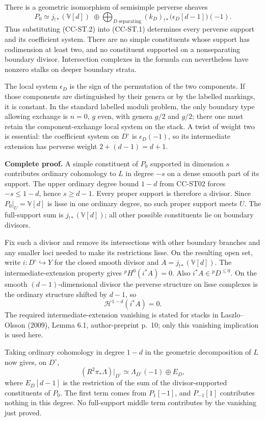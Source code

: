 \documentclass[11pt,a4paper]{article}
\theoremstyle{definition}\newtheorem{definition}[theorem]{Definition}
\theoremstyle{remark}\newtheorem{remark}[theorem]{Remark}
\begin{document}
There is a geometric isomorphism of semisimple perverse sheaves \[
P_0\simeq j_{!*}(\mathbb V[d])\;\oplus\!
\bigoplus_{D\text{ separating}}(k_D)_{!*}\bigl(\epsilon_D[d-1]\bigr)(-1).
\tag{CC-ST.2}
\] Thus substituting (CC-ST.2) into (CC-ST.1) determines every perverse
support and its coefficient system. There are no simple constituents
whose support has codimension at least two, and no constituent supported
on a nonseparating boundary divisor. Intersection complexes in the
formula can nevertheless have nonzero stalks on deeper boundary strata.

The local system \(\epsilon_D\) is the sign of the permutation of the
two components. If those components are distinguished by their genera or
by the labelled markings, it is constant. In the standard labelled
moduli problem, the only boundary type allowing exchange is \(n=0\),
\(g\) even, with genera \(g/2\) and \(g/2\); there one must retain the
component-exchange local system on the stack. A twist of weight two is
essential: the coefficient system on \(D^\circ\) is \(\epsilon_D(-1)\),
so its intermediate extension has perverse weight \(2+(d-1)=d+1\).

\textbf{Complete proof.} A simple constituent of \(P_0\) supported in
dimension \(s\) contributes ordinary cohomology to \(L\) in degree
\(-s\) on a dense smooth part of its support. The upper ordinary degree
bound \(1-d\) from CC-ST02 forces \(-s\leq1-d\), hence \(s\geq d-1\).
Every proper support is therefore a divisor. Since
\(P_0|_U=\mathbb V[d]\) is lisse in one ordinary degree, no such proper
support meets \(U\). The full-support sum is \(j_{!*}(\mathbb V[d])\);
all other possible constituents lie on boundary divisors.

Fix such a divisor and remove its intersections with other boundary
branches and any smaller loci needed to make its restrictions lisse. On
the resulting open set, write \(i:D^\circ\hookrightarrow Y\) for the
closed smooth divisor and \(A=j_{!*}(\mathbb V[d])\). The
intermediate-extension property gives \({}^pH^0(i^*A)=0\). Also
\(i^*A\in{}^pD^{\leq0}\). On the smooth \((d-1)\)-dimensional divisor
the perverse structure on lisse complexes is the ordinary structure
shifted by \(d-1\), so \[
\mathcal H^{1-d}(i^*A)=0.
\] The required intermediate-extension vanishing is stated for stacks in
Laszlo--Olsson (2009), Lemma 6.1, author-preprint p.~10; only this
vanishing implication is used here.

Taking ordinary cohomology in degree \(1-d\) in the geometric
decomposition of \(L\) now gives, on \(D^\circ\), \[
(R^2\pi_*\Lambda)|_{D^\circ}\simeq
\Lambda_{D^\circ}(-1)\oplus E_D,
\tag{CC-ST.3}
\] where \(E_D[d-1]\) is the restriction of the sum of the
divisor-supported constituents of \(P_0\). The first term comes from
\(P_1[-1]\), and \(P_{-1}[1]\) contributes nothing in this degree. No
full-support middle term contributes by the vanishing just proved.
\end{document}
